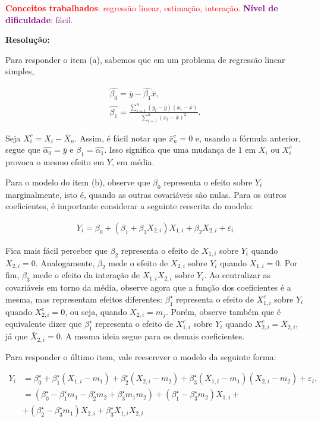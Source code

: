 \textcolor{red}{\textbf{Conceitos trabalhados}: regressão linear,  estimação, interação.}
\textcolor{purple}{\textbf{Nível de dificuldade}: fácil.}\\
{\color{blue}
\textbf{Resolução:} 

Para responder o item (a), sabemos que em um problema de regressão linear simples,

\begin{align*}
    \widehat{\beta_0} = \bar y - \widehat{\beta_1} \bar x, \\
    \widehat{\beta_1} = \frac{\sum_{i=1}^n (y_i - \bar y) (x_i - \bar x)}{\sum_{i=1}^n (x_i - \bar x)^2}.
\end{align*}

Seja $X_i^c = X_i - \bar X_n$. Assim, é fácil notar que $\bar x_n^c = 0$ e, usando a fórmula anterior, segue que $\widehat{\alpha_0} = \bar y$ e $\widehat{\beta_1} = \widehat{\alpha_1}$. Isso significa que uma mudança de $1$ em $X_i$ ou $X_i^c$ provoca o mesmo efeito em $Y$, em média.

Para o modelo do item (b), observe que $\beta_0$ representa o efeito sobre $Y_i$ marginalmente, isto é, quando as outras covariáveis são nulas. Para os outros coeficientes, é importante considerar a seguinte reescrita do modelo:

\begin{align*}
    Y_i = \beta_0 + (\beta_1 + \beta_3 X_{2,i}) X_{1,i} + \beta_2 X_{2,i} + \varepsilon_i
\end{align*}

Fica mais fácil perceber que $\beta_2$ representa o efeito de $X_{1,i}$ sobre $Y_i$ quando $X_{2,i} = 0$. Analogamente, $\beta_2$ mede o efeito de $X_{2,i}$ sobre $Y_i$ quando $X_{1,i} = 0$. Por fim, $\beta_3$ mede o efeito da interação de $X_{1,i} X_{2,i}$ sobre $Y_i$. Ao centralizar as covariáveis em torno da média, observe agora que a função dos coeficientes é a mesma, mas representam efeitos diferentes: $\beta^{\star}_1$ representa o efeito de $X_{1,i}^c$ sobre $Y_i$ quando $X_{2,i}^c = 0$, ou seja, quando $X_{2,i} = m_j$. Porém, observe também que é equivalente dizer que $\beta^{\star}_1$ representa o efeito de $X_{1,i}^c$ sobre $Y_i$ quando $X_{2,i}^c = \bar X_{2,i}$, já que $\bar X_{2,i} = 0$. A mesma ideia segue para os demais coeficientes.

Para responder o último item, vale reescrever o modelo da seguinte forma:

\begin{align*}
    Y_i &= \beta^{\star}_0 + \beta^{\star}_1 (X_{1, i} - m_1) + \beta^{\star}_2 (X_{2, i} - m_2) + \beta^{\star}_3 (X_{1, i} - m_1) (X_{2, i} - m_2) + \varepsilon_i, \\
    &= (\beta^{\star}_0 - \beta^{\star}_1 m_1 - \beta^{\star}_2 m_2 + \beta^{\star}_3 m_1 m_2) + (\beta^{\star}_1 - \beta^{\star}_3 m_2) X_{1,i} +  \\
    &+ (\beta^{\star}_2 - \beta^{\star}_3 m_1) X_{2,i} + \beta^{\star}_3 X_{1,i} X_{2,i}
\end{align*}

}
